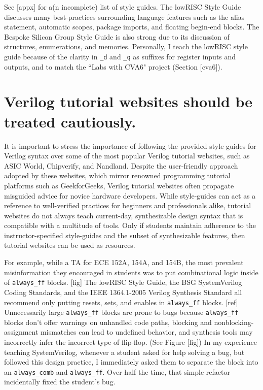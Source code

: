 See [appx] for a(n incomplete) list of style guides. The lowRISC Style Guide discusses many best-practices surrounding language features such as the alias statement, automatic scopes, package imports, and floating begin-end blocks. The Bespoke Silicon Group Style Guide is also strong due to its discussion of structures, enumerations, and memories. Personally, I teach the lowRISC style guide because of the clarity in \texttt{_d} and \texttt{_q} as suffixes for register inputs and outputs, and to match the ``Labs with CVA6" project (Section [cva6]).

\section{Verilog tutorial websites should be treated cautiously.}

It is important to stress the importance of following the provided style guides for Verilog syntax over some of the most popular Verilog tutorial websites, such as ASIC World, Chipverify, and Nandland. Despite the user-friendly approach adopted by these websites, which mirror renowned programming tutorial platforms such as GeekforGeeks, Verilog tutorial websites often propagate misguided advice for novice hardware developers. While style-guides can act as a reference to well-verified practices for beginners and professionals alike, tutorial websites do not always teach current-day, synthesizable design syntax that is compatible with a multitude of tools. Only if students maintain adherence to the instructor-specified style-guides and the subset of synthesizable features, then tutorial websites can be used as resources.

For example, while a TA for ECE 152A, 154A, and 154B, the most prevalent misinformation they encouraged in students was to put combinational logic inside of \texttt{always_ff} blocks. [fig] The lowRISC Style Guide, the BSG SystemVerilog Coding Standards, and the IEEE 1364.1-2005 Verilog Synthesis Standard all recommend only putting resets, sets, and enables in \texttt{always_ff} blocks. [ref] Unnecessarily large \texttt{always_ff} blocks are prone to bugs because \texttt{always_ff} blocks don't offer warnings on unhandled code paths, blocking and nonblocking-assignment mismatches can lead to undefined behavior, and synthesis tools may incorrectly infer the incorrect type of flip-flop. (See Figure [fig]) In my experience teaching SystemVerilog, whenever a student asked for help solving a bug, but followed this design practice, I immediately asked them to separate the block into an \texttt{always_comb} and \texttt{always_ff}. Over half the time, that simple refactor incidentally fixed the student's bug.

